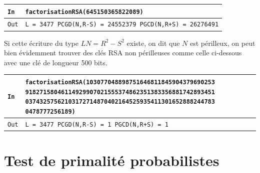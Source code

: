 \documentclass[titlepage]{article}
\begin{document}
    \begin{tabularx}{12cm}{|p{0.60cm}|X|}
        \hline
        \rowcolor{gray}
        \texttt{In}
        & 
        \texttt{factorisationRSA(645150365822089)}
        \\
        \hline
        \texttt{Out}
        &
        \texttt{L =  3477 \newline
        PCGD(N,R-S) =  24552379 \newline
        PGCD(N,R+S) =  26276491}
        \\
        \hline
    \end{tabularx}
    \bigbreak

    Si cette écriture du type $LN = R^2 - S^2$ existe, on dit que $N$ est périlleux, on peut bien évidemment trouver des clés RSA non périlleuses comme celle ci-dessous avec une clé de longueur 500 bits.\bigbreak
    
    \begin{tabularx}{12cm}{|p{0.60cm}|X|}
        \hline
        \rowcolor{gray}
        \texttt{In}
        & 
        \texttt{factorisationRSA(103077048898751646811845904379690253
        91827158046114929907021555374862351383356881742893451
        03743257562103172714870402164525935411301652888244783
        0478777256189)}
        \\
        \hline
        \texttt{Out}
        &
        \texttt{L =  3477 \newline
        PCGD(N,R-S) =  1 \newline
        PGCD(N,R+S) =  1}
        \\
        \hline
    \end{tabularx}
    \bigbreak
    

    \section{Test de primalité probabilistes}
\end{document}
